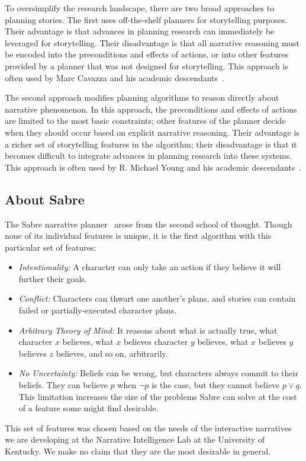 \documentclass{nilreport}
\begin{document}
To oversimplify the research landscape, there are two broad approaches
to planning stories. The first uses off-the-shelf planners for storytelling
purposes. Their advantage is that advances in planning research can
immediately be leveraged for storytelling. Their disadvantage is that
all narrative reasoning must be encoded into the preconditions and
effects of actions, or into other features provided by a planner that
was not designed for storytelling. This approach is often used by
Marc Cavazza and his academic descendants~\cite{cavazza2002character,porteous2010applying}.

The second approach modifies planning algorithms to reason directly
about narrative phenomenon. In this approach, the preconditions and
effects of actions are limited to the most basic constraints; other
features of the planner decide when they should occur based on explicit
narrative reasoning. Their advantage is a richer set of storytelling
features in the algorithm; their disadvantage is that it becomes difficult
to integrate advances in planning research into these systems. This
approach is often used by R. Michael Young and his academic descendants~\cite{young2013plans}.

\subsection{About Sabre}

The Sabre narrative planner~\cite{ware2021sabre} arose from the
second school of thought. Though none of its individual features is
unique, it is the first algorithm with this particular set of features:
\begin{itemize}
\item \emph{Intentionality:} A character can only take an action if they
believe it will further their goals.
\item \emph{Conflict:} Characters can thwart one another's plans, and stories
can contain failed or partially-executed character plans.
\item \emph{Arbitrary Theory of Mind:} It reasons about what is actually
true, what character $x$ believes, what $x$ believes character $y$
believes, what $x$ believes $y$ believes $z$ believes, and so on,
arbitrarily.
\item \emph{No Uncertainty:} Beliefs can be wrong, but characters always
commit to their beliefs. They can believe $p$ when $\neg p$ is the
case, but they cannot believe $p\vee q$. This limitation increases
the size of the problems Sabre can solve at the cost of a feature
some might find desirable.
\end{itemize}
\noindent This set of features was chosen based on the needs of the
interactive narratives we are developing at the Narrative Intelligence
Lab at the University of Kentucky. We make no claim that they are
the most desirable in general.
\end{document}
